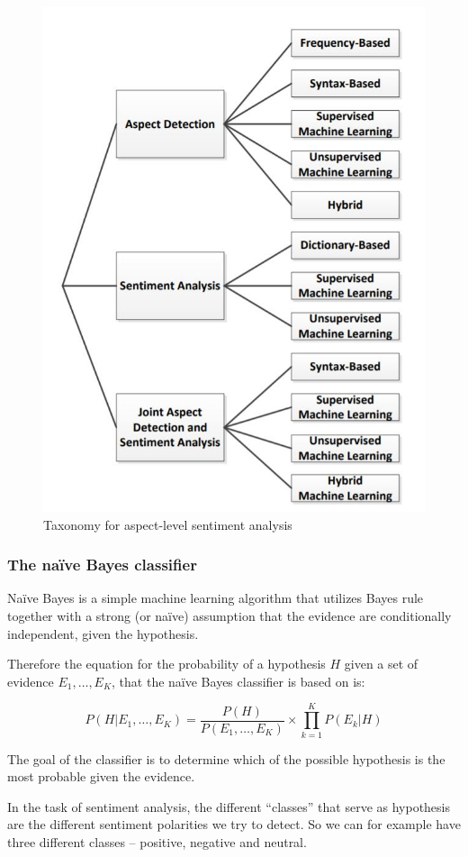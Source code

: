   \begin{figure}[htbp!]\centering
\includegraphics[width=.66\textwidth]{img/taxonomy_om}
      \caption[Taxonomy for aspect-level sentiment analysis]{Taxonomy for aspect-level sentiment analysis \cite{schouten_2016}}\label{img01:taxOM}
    \end{figure}
\subsubsection{The na\"ive Bayes classifier}
\label{sec:NBC}
 Naïve Bayes is a simple machine learning algorithm that utilizes  Bayes rule together with a strong (or na\"ive) assumption that the evidence are conditionally independent, given the hypothesis. \cite{NB}

Therefore the equation for the probability of a hypothesis $H$ given a set of evidence $E_{1},\ldots,E_{K}$, that the na\"ive Bayes classifier is based on is:

$$P\left(H|E_{1},\ldots,E_{K}\right)=\frac{P(H)}{P(E_{1},\ldots,E_{K})}\times\prod_{k=1}^{K}P\left(E_{k}|H\right)
$$

The goal of the classifier is to determine which of the possible hypothesis is the most probable given the evidence.

In the task of sentiment analysis, the different ``classes'' that serve as hypothesis are the different sentiment polarities we try to detect. So we can for example have three different classes -- positive, negative and neutral.

